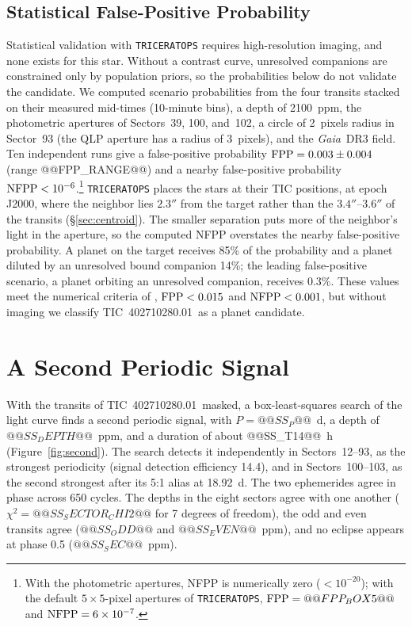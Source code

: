 \documentclass[twocolumn,linenumbers]{aastex701}
\newcommand{\planet}{TIC~402710280.01}
\newcommand{\gaia}{\textit{Gaia}}
\begin{document}
\subsection{Statistical False-Positive Probability} \label{sec:fpp}

Statistical validation with \texttt{TRICERATOPS} \citep{Giacalone2020, Giacalone2021} requires high-resolution imaging, and none exists for this star. Without a contrast curve, unresolved companions are constrained only by population priors, so the probabilities below do not validate the candidate. We computed scenario probabilities from the four transits stacked on their measured mid-times (10-minute bins), a depth of 2100~ppm, the photometric apertures of Sectors~39, 100, and~102, a circle of 2~pixels radius in Sector~93 (the QLP aperture has a radius of 3~pixels), and the \gaia\ DR3 field. Ten independent runs give a false-positive probability ${\rm FPP} = 0.003 \pm 0.004$ (range @@FPP_RANGE@@) and a nearby false-positive probability ${\rm NFPP} < 10^{-6}$.\footnote{With the photometric apertures, NFPP is numerically zero ($<10^{-20}$); with the default $5 \times 5$-pixel apertures of \texttt{TRICERATOPS}, ${\rm FPP} = @@FPP_BOX5@@$ and ${\rm NFPP} = 6 \times 10^{-7}$.} \texttt{TRICERATOPS} places the stars at their TIC positions, at epoch J2000, where the neighbor lies $2.3''$ from the target rather than the $3.4''$--$3.6''$ of the transits (\S\ref{sec:centroid}). The smaller separation puts more of the neighbor's light in the aperture, so the computed NFPP overstates the nearby false-positive probability. A planet on the target receives 85\% of the probability and a planet diluted by an unresolved bound companion 14\%; the leading false-positive scenario, a planet orbiting an unresolved companion, receives 0.3\%. These values meet the numerical criteria of \citet{Giacalone2021}, ${\rm FPP} < 0.015$ and ${\rm NFPP} < 0.001$, but without imaging we classify \planet\ as a planet candidate.

\section{A Second Periodic Signal} \label{sec:second}

With the transits of \planet\ masked, a box-least-squares search \citep{Kovacs2002} of the light curve finds a second periodic signal, with $P = @@SS_P@@$~d, a depth of $@@SS_DEPTH@@$~ppm, and a duration of about @@SS_T14@@~h (Figure~\ref{fig:second}). The search detects it independently in Sectors~12--93, as the strongest periodicity (signal detection efficiency 14.4), and in Sectors~100--103, as the second strongest after its 5:1 alias at 18.92~d. The two ephemerides agree in phase across 650 cycles. The depths in the eight sectors agree with one another ($\chi^2 = @@SS_SECTOR_CHI2@@$ for 7 degrees of freedom), the odd and even transits agree ($@@SS_ODD@@$ and $@@SS_EVEN@@$~ppm), and no eclipse appears at phase 0.5 ($@@SS_SEC@@$~ppm).
\end{document}
